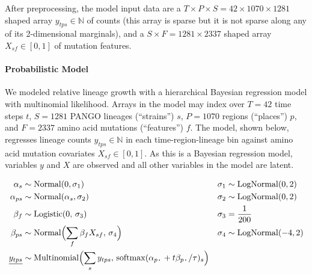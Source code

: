 \documentclass[12pt]{article}
\newcommand \blank {{\,\pmb\cdot\,}}
\begin{document}
After preprocessing, the model input data are a $T\times P\times S = 42 \times 1070 \times 1281$ shaped array $y_{tps}\in\mathbb N$ of counts (this array is sparse but it is not sparse along any of its 2-dimensional marginals), and a $S\times F = 1281 \times 2337$ shaped array $X_{sf}\in[0,1]$ of mutation features.

\paragraph*{Probabilistic Model}

% 

We modeled relative lineage growth with a hierarchical Bayesian regression model with multinomial likelihood.
Arrays in the model may index over $T{=}42$ time steps $t$, $S{=}1281$ PANGO lineages (``strains'') $s$, $P{=}1070$ regions (``places'') $p$, and $F{=}2337$ amino acid mutations (``features'') $f$.
The model, shown below, regresses lineage counts $y_{tps}\in\mathbb N$ in each time-region-lineage bin against amino acid mutation covariates $X_{sf} \in [0,1]$.
As this is a Bayesian regression model, variables $y$ and $X$ are observed and all other variables in the model are latent.

\begin{align*}
  \textstyle
  \alpha_s &\sim \operatorname{Normal}(0, \sigma_1) &
  \sigma_1 &\sim \operatorname{LogNormal}(0, 2) \\
  \alpha_{ps} &\sim \operatorname{Normal}(\alpha_s, \sigma_2) &
  \sigma_2 &\sim \operatorname{LogNormal}(0, 2) \\
  \beta_f &\sim \operatorname{Logistic}(0,\, \sigma_3) &
  \sigma_3 &= \frac{1}{200} \\
  \beta_{ps} &\sim \operatorname{Normal}\Bigl(
   \sum_f \beta_f X_{sf},\, \sigma_4
  \Bigr) &
  \sigma_4 &\sim \operatorname{LogNormal}(-4, 2) \\
  \underline{y_{tps}} &\sim \operatorname{Multinomial}\Bigl(
    \sum_s y_{tps},\, \operatorname{softmax}(\alpha_{p\blank} + t\beta_{p\blank}/\tau)_s
  \Bigr)
\end{align*}
\end{document}
